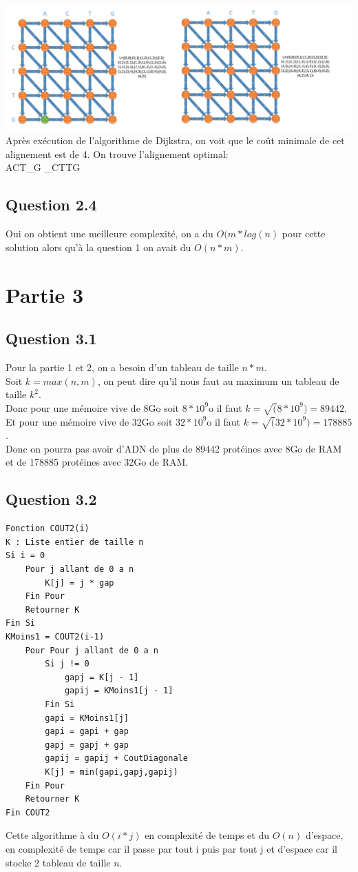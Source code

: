 \documentclass[5pt,a4paper]{report}
\begin{document}
	\includegraphics[scale=0.08]{Q23-7}\\
	Après exécution de l'algorithme de Dijkstra, on voit que le coût minimale de cet alignement est de 4. On trouve l'alignement optimal:\\
	ACT\_G
	\_CTTG
	
	\subsection*{Question 2.4}
	Oui on obtient une meilleure complexité, on a du $O(m*log(n)$ pour cette solution alors qu'à la question 1 on avait du $O(n*m)$.
	
	\section*{Partie 3}
	\subsection*{Question 3.1}
	Pour la partie 1 et 2, on a besoin d'un tableau de taille $n*m$.\\
	Soit $k = max(n,m)$, on peut dire qu'il nous faut au maximum un tableau de taille $k^2$.\\
	Donc pour une mémoire vive de $8$Go soit $8*10^9$o il faut $k = \sqrt(8*10^9) = 89442$.\\
	Et pour une mémoire vive de $32$Go soit $32*10^9$o il faut $k = \sqrt(32*10^9) = 178885$.\\
	Donc on pourra pas avoir d'ADN de plus de 89442 protéines avec 8Go de RAM et de 178885 protéines avec 32Go de RAM.
	
	\subsection*{Question 3.2}
	\begin{lstlisting}
Fonction COUT2(i)
K : Liste entier de taille n
Si i = 0
	Pour j allant de 0 a n
		K[j] = j * gap
	Fin Pour
	Retourner K
Fin Si
KMoins1 = COUT2(i-1)
	Pour Pour j allant de 0 a n
		Si j != 0
			gapj = K[j - 1]
			gapij = KMoins1[j - 1]
		Fin Si
		gapi = KMoins1[j]
		gapi = gapi + gap
		gapj = gapj + gap
		gapij = gapij + CoutDiagonale
		K[j] = min(gapi,gapj,gapij)
	Fin Pour
	Retourner K
Fin COUT2
	\end{lstlisting}
	Cette algorithme à du $O(i * j)$ en complexité de temps et du $O(n)$ d'espace, en complexité de 
	temps car il passe par tout i puis par tout j et d'espace car il stocke 2 tableau de taille $n$.
	
\end{document}

